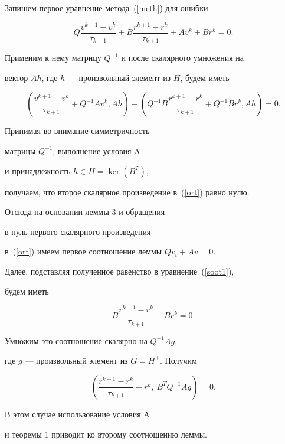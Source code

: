 \begin{pf}


Запишем первое уравнение метода~(\ref{meth}) для ошибки


\begin{equation}


\label{soot1}


Q \dfrac {v^{k+1}-v^k} {\tau_{k+1}} + B \dfrac{r^{k+1}-r^k}{\tau_{k+1}} +


A v^k + B r^k = 0 .


\end{equation}


Применим к нему матрицу $Q^{-1}$ и после скалярного умножения на


вектор $A h$, где $h$ --- произвольный элемент из $H$, будем иметь


\begin{equation}


\label{ort}


\left( \dfrac{v^{k+1}-v^k}{\tau_{k+1}}+Q^{-1}Av^k, A h \right) +


\left( Q^{-1}B\dfrac{r^{k+1}-r^k}{\tau_{k+1}}+Q^{-1}Br^k, A h \right) = 0.


\end{equation}


Принимая во внимание симметричность


матрицы $Q^{-1}$, выполнение условия $\mathrm A$


и принадлежность $h \in H = \ker(B^T)$,


получаем, что второе скалярное произведение в~(\ref{ort}) равно нулю.


Отсюда на основании леммы 3 и обращения


в нуль первого скалярного произведения


в~(\ref{ort}) имеем первое соотношение леммы $Q v_t + A v = 0$.





Далее, подставляя полученное равенство в уравнение~(\ref{soot1}),


будем иметь


$$


B \dfrac{r^{k+1}-r^k}{\tau_{k+1}} +


B r^k = 0 .


$$


Умножим это соотношение скалярно на $Q^{-1}A g$,


где $g$ --- произвольный элемент из $G=H^{\perp}$. Получим


$$


\left( \dfrac{r^{k+1}-r^k}{\tau_{k+1}} + r^k,\ B^T Q^{-1} A g \right)=0.


$$


В этом случае использование условия $\mathrm A$


и теоремы 1 приводит ко второму соотношению леммы.


\end{pf}





